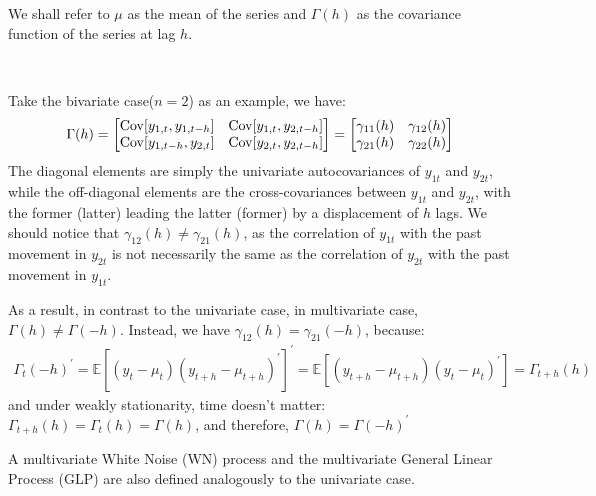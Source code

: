 We shall refer to $\mu$ as the mean of the series and $\Gamma(h)$ as the covariance function of the series at lag $h$. 
\begin{eg}
    \

    Take the bivariate case($n=2$) as an example, we have:
    \begin{gather*}
        \Gamma(h) = \begin{bmatrix}
            \operatorname{Cov}[y_{1,t}, y_{1,t-h}] & \operatorname{Cov}[y_{1,t}, y_{2,t-h}] \\
            \operatorname{Cov}[y_{1,t-h}, y_{2,t}] & \operatorname{Cov}[y_{2,t}, y_{2,t-h}] \\
        \end{bmatrix}
        = \begin{bmatrix}
            \gamma_{11}(h) & \gamma_{12}(h) \\
            \gamma_{21}(h) & \gamma_{22}(h) \\
        \end{bmatrix}
    \end{gather*}
    The diagonal elements are simply the univariate autocovariances of $y_{1t}$ and $y_{2t}$,
    while the off-diagonal elements are the cross-covariances between $y_{1t}$ and $y_{2t}$,
    with the former (latter) leading the latter (former) by a displacement of $h$ lags.
    We should notice that $\gamma_{12}(h) \neq \gamma_{21}(h)$,
    as the correlation of $y_{1t}$ with the past movement in $y_{2t}$ is not necessarily the same as the correlation of $y_{2t}$ with the past movement in $y_{1t}$.

    As a result, in contrast to the univariate case, in multivariate case, $\Gamma(h) \neq \Gamma(-h).$
    Instead, we have $\gamma_{12} (h) = \gamma_{21} (-h)$, because:
    \begin{gather*}
        \Gamma_t(-h)^{\prime} = \mathbb{E}\left[(y_t - \mu_t)(y_{t+h} - \mu_{t+h})^{\prime}\right]^{\prime} = \mathbb{E}\left[(y_{t+h} - \mu_{t+h})(y_t - \mu_t)^{\prime} \right] = \Gamma_{t+h}(h)
    \end{gather*}
    and under weakly stationarity, time doesn't matter: $\Gamma_{t+h}(h) = \Gamma_t(h) = \Gamma(h)$,
    and therefore, $\Gamma(h) = \Gamma(-h)^{\prime}$
\end{eg}
A multivariate White Noise (WN) process and the multivariate General Linear Process
(GLP) are also defined analogously to the univariate case.
